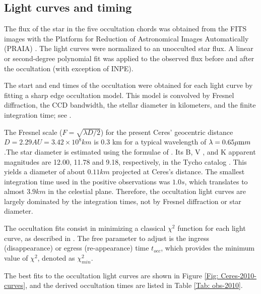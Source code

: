 \documentclass[useAMS,usenatbib]{mn2e}
\begin{document}
\subsection{Light curves and timing \label{Sec: light-curve-2010}}

The flux of the star in the five occultation chords was obtained from the FITS images with the Platform for Reduction of Astronomical Images Automatically (PRAIA) \citep{2011gfun.conf...85A}. The light curves were normalized to an unocculted star flux. A linear or second-degree polynomial fit was applied to the observed flux before and after the occultation (with exception of INPE).

The start and end times of the occultation were obtained for each light curve by fitting a sharp edge occultation model. This model is convolved by Fresnel diffraction, the CCD bandwidth, the stellar diameter in kilometers, and the finite integration time; see \cite{Widemann2009}.

The Fresnel scale ($F = \sqrt{\lambda D/2}$) for the present Ceres’ geocentric distance $D = 2.29 AU = 3.42 \times 10^{8} km$ is 0.3 km for a typical wavelength of $\lambda = 0.65 \hbox{$\mu$m} m$.The star diameter is estimated using the formulae of \cite{vanBelle1999}. Its B, V , and K apparent magnitudes are 12.00, 11.78 and 9.18, respectively, in the Tycho catalog \citep{Hog2000}. This yields a diameter of about $0.11 km$ projected at Ceres’s distance. The smallest integration time used in the positive observations was $1.0 s$, which translates to almost $3.9 km$ in the celestial plane. Therefore, the occultation light curves are largely dominated by the integration times, not by Fresnel diffraction or star diameter.

The occultation fits consist in minimizing a classical $\chi^{2}$ function for each light curve, as described in \cite{Sicardy2011}. The free parameter to adjust is the ingress (disappearance) or egress (re-appearance) time $t_{occ}$, which provides the minimum value of $\chi^{2}$, denoted as $\chi^{2}_{min}$.

The best fits to the occultation light curves are shown in Figure \ref{Fig: Ceres-2010-curves}, and the derived occultation times are listed in Table \ref{Tab: obs-2010}.
\end{document}
